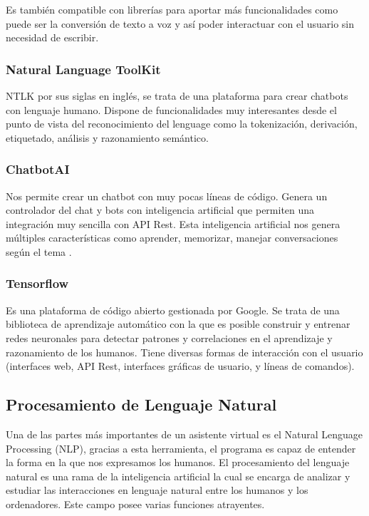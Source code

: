 Es también compatible con librerías para aportar más funcionalidades como puede ser la conversión de texto a voz y así poder interactuar con el usuario sin necesidad de escribir.

\subsubsection{Natural Language ToolKit} NTLK por sus siglas en inglés, se trata de una plataforma para crear chatbots con lenguaje humano. Dispone de funcionalidades muy interesantes desde el punto de vista del reconocimiento del lenguage como la tokenización, derivación, etiquetado, análisis y razonamiento semántico.

\subsubsection{ChatbotAI} Nos permite crear un chatbot con muy pocas líneas de código. Genera un controlador del chat y bots con inteligencia artificial que permiten una integración muy sencilla con API Rest. Esta inteligencia artificial nos genera múltiples características como aprender, memorizar, manejar conversaciones según el tema \cite{chatbotAI}. 

\subsubsection{Tensorflow} Es una plataforma de código abierto gestionada por Google. Se trata de una biblioteca de aprendizaje automático con la que es posible construir y entrenar redes neuronales para detectar patrones y correlaciones en el aprendizaje y razonamiento de los humanos. Tiene diversas formas de interacción con el usuario (interfaces web, API Rest, interfaces gráficas de usuario, y líneas de comandos).

\subsection{Procesamiento de Lenguaje Natural}
Una de las partes más importantes de un asistente virtual es el Natural Lenguage Processing (NLP), gracias a esta herramienta, el programa es capaz de entender la forma en la que nos expresamos los humanos. 
El procesamiento del lenguaje natural es una rama de la inteligencia artificial la cual se encarga de analizar y estudiar las interacciones en lenguaje natural entre los humanos y los ordenadores. Este campo posee varias funciones atrayentes.

